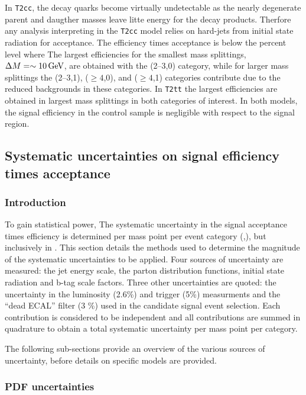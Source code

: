 In \verb!T2cc!, the decay quarks become virtually undetectable as 
the nearly degenerate parent and daugther masses leave litte energy for the decay 
products. Therfore any analysis interpreting in the \verb!T2cc! model 
relies on hard-\Pt jets from initial state radiation for acceptance. The 
efficiency times acceptance is below the percent level where The largest 
efficiencies for the smallest mass splittings, $\Delta M = \sim10\,\text{Ge\hspace{-.08em}V}$, 
are obtained with the (2--3,0) category, while for larger mass splittings 
the (2--3,1), ($\geq 4$,0), and ($\geq 4$,1) categories contribute 
due to the reduced backgrounds in these categories. In \verb!T2tt! the largest
efficiencies are obtained in largest mass splittings in both categories of interest. 
In both models, the signal efficiency in the \mj control sample is negligible 
with respect to the signal region. 

\clearpage
\subsection{Systematic uncertainties on signal efficiency times 
  acceptance\label{sec:sms-syst}}

\subsubsection{Introduction} 

To gain statistical power, The systematic uncertainty in the signal 
acceptance times efficiency is determined per mass point per event 
category (\njet,\nb), but inclusively in \scalht . This section details the methods 
used to determine the magnitude of the systematic uncertainties to be applied. 
Four sources of uncertainty are measured: the jet energy scale,
the parton distribution functions, initial state radiation and b-tag scale
factors. Three other uncertainties are quoted: the uncertainty in the luminosity (2.6\%) and
trigger (5\%) measurments and the ``dead ECAL'' filter (3 \%) used in the candidate signal
event selection. Each contribution is considered to be independent 
and all contributions are summed in quadrature to obtain a total 
systematic uncertainty per mass point per category.

The following sub-sections provide an overview of the various sources of
uncertainty, before details on specific models are provided. 

\subsubsection{PDF uncertainties\label{sec:pdf-sets}}

